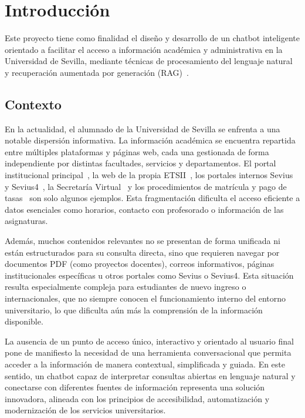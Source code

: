 \chapter{Introducción}
\label{cap:introduccion}

Este proyecto tiene como finalidad el diseño y desarrollo de un chatbot inteligente orientado a facilitar el acceso a información académica y administrativa en la Universidad de Sevilla, mediante técnicas de procesamiento del lenguaje natural~\cite{jurafsky2009speech} y recuperación aumentada por generación (RAG)~\cite{lewis2020retrieval}.

\section{Contexto}
\label{sec:contexto}

En la actualidad, el alumnado de la Universidad de Sevilla se enfrenta a una notable dispersión informativa. La información académica se encuentra repartida entre múltiples plataformas y páginas web, cada una gestionada de forma independiente por distintas facultades, servicios y departamentos. El portal institucional principal~\cite{usWeb}, la web de la propia ETSII~\cite{etsiiWeb}, los portales internos Sevius~\cite{sevius} y Sevius4~\cite{sevius4}, la Secretaría Virtual~\cite{usSecretaria} y los procedimientos de matrícula y pago de tasas~\cite{usMatricula,usPago} son solo algunos ejemplos. Esta fragmentación dificulta el acceso eficiente a datos esenciales como horarios, contacto con profesorado o información de las asignaturas.

Además, muchos contenidos relevantes no se presentan de forma unificada ni están estructurados para su consulta directa, sino que requieren navegar por documentos PDF (como proyectos docentes), correos informativos, páginas institucionales específicas u otros portales como Sevius o Sevius4. Esta situación resulta especialmente compleja para estudiantes de nuevo ingreso o internacionales, que no siempre conocen el funcionamiento interno del entorno universitario, lo que dificulta aún más la comprensión de la información disponible.

La ausencia de un punto de acceso único, interactivo y orientado al usuario final pone de manifiesto la necesidad de una herramienta conversacional que permita acceder a la información de manera contextual, simplificada y guiada. En este sentido, un chatbot capaz de interpretar consultas abiertas en lenguaje natural y conectarse con diferentes fuentes de información representa una solución innovadora, alineada con los principios de accesibilidad, automatización y modernización de los servicios universitarios.

